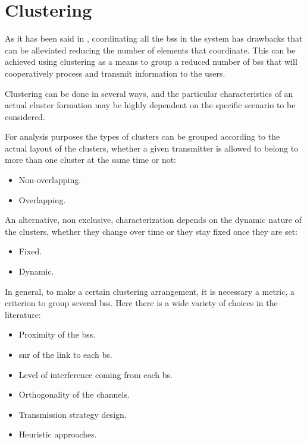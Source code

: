 \section{Clustering} \label{sec:sa_cluster}

As it has been said in , coordinating all the \glspl{bs} in the
system has drawbacks that can be alleviated reducing the number of elements that
coordinate. This can be achieved using clustering as a means to group a reduced
number of \glspl{bs} that will cooperatively process and transmit information to
the users.

Clustering can be done in several ways, and the particular characteristics of
an actual cluster formation may be highly dependent on the specific scenario to
be considered.

For analysis purposes the types of clusters can be grouped according to the
actual layout of the clusters, whether a given transmitter is allowed to belong
to more than one cluster at the same time or not:

\begin{itemize}
    \item Non-overlapping.
    \item Overlapping.
\end{itemize}

An alternative, non exclusive, characterization depends on the dynamic nature of
the clusters, whether they change over time or they stay fixed once they are
set:

\begin{itemize}
    \item Fixed.
    \item Dynamic.
\end{itemize}

In general, to make a certain clustering arrangement, it is necessary a metric,
a criterion to group several \glspl{bs}. Here there is a wide variety of choices
in the literature:

\begin{itemize}
    \item Proximity of the \glspl{bs}. 
    \item \gls{snr} of the link to each \gls{bs}.
    \item Level of interference coming from each \gls{bs}.
    \item Orthogonality of the channels.
    \item Transmission strategy design.
    \item Heuristic approaches.
\end{itemize}

